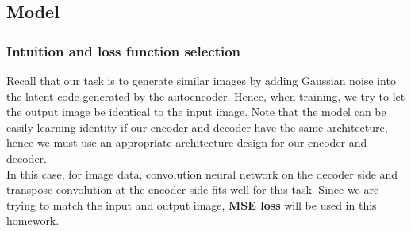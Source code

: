 \documentclass[a4paper, 10]{article}
\begin{document}
    \subsection{Model}
        \subsubsection{Intuition and loss function selection} 
            Recall that our task is to generate similar images by adding
            Gaussian noise into the latent code generated by the autoencoder.
            Hence, when training, we try to let the output image be identical
            to the input image. Note that the model can be easily learning
            identity if our encoder and decoder have the same architecture, hence
            we must use an appropriate architecture design for our encoder and decoder. \\
            \indent In this case, for image data, convolution neural network on the decoder
            side and transpose-convolution at the encoder side fits well for this task.
            Since we are trying to match the input and output image, \textbf{MSE loss}
            will be used in this homework.
\end{document}
